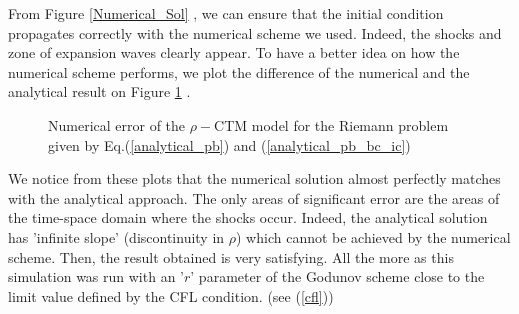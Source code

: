 \documentclass[letterpaper,10pt]{article}
\begin{document}
\bigskip
From Figure \ref{Numerical_Sol} , we can ensure that the initial condition propagates correctly with the numerical scheme we used. Indeed, the shocks and zone of expansion waves clearly appear. To have a better idea on how the numerical scheme performs, we plot the difference of the numerical and the analytical result on Figure \ref{Numerical_err} .

\begin{figure}
  \centering
  \caption{Numerical error of the $\rho-$CTM model for the Riemann problem given by Eq.(\ref{analytical_pb}) and (\ref{analytical_pb_bc_ic})}
  \label{Numerical_err}
\end{figure}

\bigskip
We notice from these plots that the numerical solution almost perfectly matches with the analytical approach. The only areas of significant error are the areas of the time-space domain where the shocks occur. Indeed, the analytical solution has 'infinite slope' (discontinuity in $\rho$) which cannot be achieved by the numerical scheme. Then, the result obtained is very satisfying. All the more as this simulation was run with an '$r$' parameter of the Godunov scheme close to the limit value defined by the CFL condition. (see (\ref{cfl}))
\end{document}
